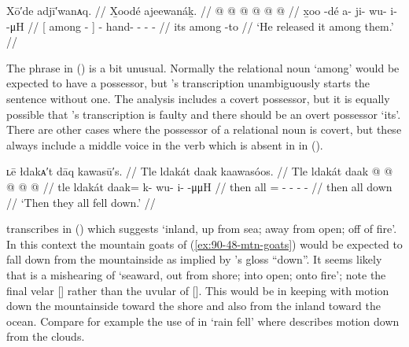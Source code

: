\ex\label{ex:90-49-let-loose-among}%
%
\begingl
	\glpreamble	Xō′de adjī′wanᴀq. //
	\glpreamble	X̱oodé ajeewanáḵ. //
	\gla	{} {}  @ {} {}
		 @ {} @ {} @ {} @ {} @ {}  //
	\glb	{} {} x̱oo -dé {}
		a- ji- wu- i-  -μH //
	\glc	{}[  among - {}]
		- hand- - -  - //
	\gld	{} its among -to {}
		 {} {} {} {} {} //
	\glft	‘He released it among them.’
		//
\endgl
\xe

The phrase  in (\lastx) is a bit unusual.
Normally the relational noun  ‘among’ would be expected to have a possessor, but \citeauthor{swanton:1909}’s transcription unambiguously starts the sentence without one.
The analysis includes a covert possessor, but it is equally possible that \citeauthor{swanton:1909}’s transcription is faulty and there should be an overt possessor  ‘its’.
There are other cases where the possessor of a relational noun is covert, but these always include a middle voice  in the verb which is absent in  in (\lastx).

\ex\label{ex:90-50-all-fall-down}%
%
\begingl
	\glpreamble	ʟē łdakᴀ′t dāq kawasū′s. //
	\glpreamble	Tle ldakát daak kaawasóos. //
	\gla	Tle ldakát daak @  @ {} @ {} @ {} @ {} //
	\glb	tle ldakát daak= k- wu- i-  -μμH //
	\glc	then all = - - -  - //
	\gld	then all down  {} {} {} {} //
	\glft	‘Then they all fell down.’
		//
\endgl
\xe

\citeauthor{swanton:1909} transcribes  in (\lastx) which suggests  ‘inland, up from sea; away from open; off of fire’.
In this context the mountain goats of (\ref{ex:90-48-mtn-goats}) would be expected to fall down from the mountainside as implied by \citeauthor{swanton:1909}’s gloss “down”.
It seems likely that  is a mishearing of  ‘seaward, out from shore; into open; onto fire’; note the final velar [] rather than the uvular of  [].
This would be in keeping with motion down the mountainside toward the shore and also from the inland toward the ocean.
Compare for example the use of  in  ‘rain fell’ where  describes motion down from the clouds.

